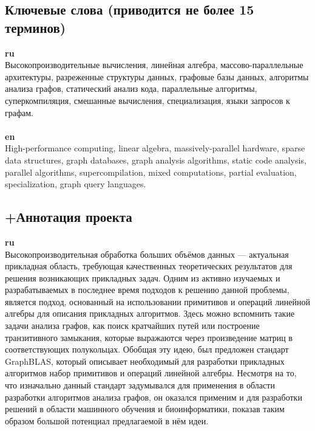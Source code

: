 \documentclass[12pt]{article}  %
\theoremstyle{remark}
\begin{document}
\subsection{Ключевые слова (приводится не более 15 терминов)}

\textbf{ru}\\
%
Высокопроизводительные вычисления, линейная алгебра, массово-параллельные архитектуры, разреженные структуры данных, графовые базы данных, алгоритмы анализа графов, статический анализ кода, параллельные алгоритмы, суперкомпиляция, смешанные вычисления, специализация, языки запросов к графам.
\\
\\
\textbf{en}\\

High-performance computing, linear algebra, massively-parallel hardware, sparse data structures, graph databases, graph analysis algorithms, static code analysis, parallel algorithms, supercompilation, mixed computations, partial evaluation, specialization, graph query languages.



\subsection{+Аннотация проекта}
\textbf{ru}\\

Высокопроизводительная обработка больших объёмов данных --- актуальная прикладная область, требующая качественных теоретических результатов для решения возникающих прикладных задач. Одним из активно изучаемых и разрабатываемых в последнее время подходов к решению данной проблемы, является подход, основанный на использовании примитивов и операций линейной алгебры для описания прикладных алгоритмов. Здесь можно вспомнить такие задачи анализа графов, как поиск кратчайших путей или построение транзитивного замыкания, которые выражаются через произведение матриц в соответствующих полукольцах. Обобщая эту идею, был предложен стандарт GraphBLAS, который описывает необходимый для разработки прикладных алгоритмов набор примитивов и операций линейной алгебры. Несмотря на то, что изначально данный стандарт задумывался для применения в области разработки алгоритмов анализа графов, он оказался применим и для разработки решений в области машинного обучения и биоинформатики, показав таким образом большой потенциал предлагаемой в нём идеи.
\end{document}
